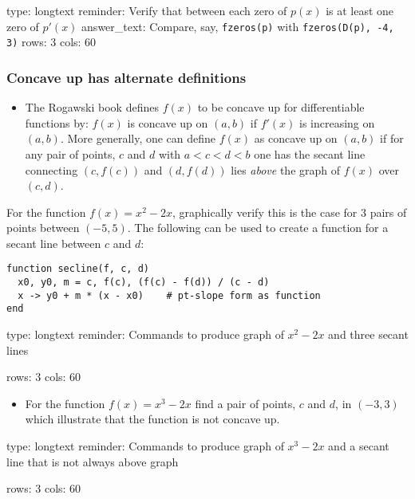 \documentclass[12pt]{article}
\begin{document}
\begin{answer}
type: longtext
reminder: Verify that between each zero of \( p(x) \) is at least one zero of \( p'(x) \)
answer_text: Compare, say, \verb+fzeros(p)+ with \verb+fzeros(D(p), -4, 3)+ 
rows: 3
cols: 60
\end{answer}

\subsubsection{Concave up has alternate definitions}

\begin{itemize}
\itemsep1pt\parskip0pt
\item
  The Rogawski book defines $f(x)$ to be concave up for differentiable
  functions by: $f(x)$ is concave up on $(a,b)$ if $f'(x)$ is increasing
  on $(a,b)$. More generally, one can define $f(x)$ as concave up on
  $(a,b)$ if for any pair of points, $c$ and $d$ with $a < c < d < b$
  one has the secant line connecting $(c,f(c))$ and $(d,f(d))$ lies
  \emph{above} the graph of $f(x)$ over $(c,d)$.
\end{itemize}

For the function $f(x) = x^2 - 2x$, graphically verify this is the case
for 3 pairs of points between $(-5,5)$. The following can be used to
create a function for a secant line between $c$ and $d$:



\begin{verbatim}
function secline(f, c, d)
  x0, y0, m = c, f(c), (f(c) - f(d)) / (c - d)
  x -> y0 + m * (x - x0)    # pt-slope form as function
end
\end{verbatim}
\begin{answer}
type: longtext
reminder: Commands to produce graph of \( x^2 - 2x \) and three secant lines

rows: 3
cols: 60
\end{answer}

\begin{itemize}
\itemsep1pt\parskip0pt
\item
  For the function $f(x) = x^3 - 2x$ find a pair of points, $c$ and $d$,
  in $(-3,3)$ which illustrate that the function is not concave up.
\end{itemize}

\begin{answer}
type: longtext
reminder: Commands to produce graph of \( x^3 - 2x \) and a secant line that is not always above graph

rows: 3
cols: 60
\end{answer}
\end{document}

